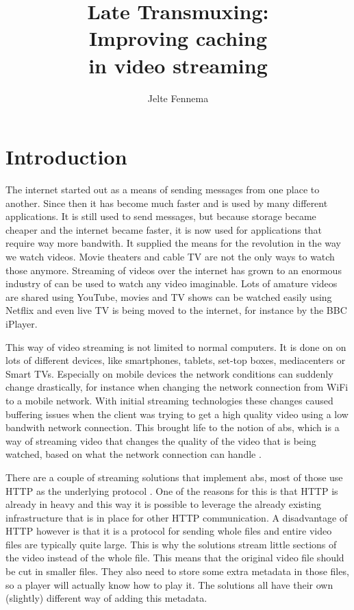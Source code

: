 \documentclass[twoside,openright]{uva-bachelor-thesis}
\title{Late Transmuxing:\\Improving caching \\in video streaming}
\author{Jelte Fennema}
\begin{document}
\maketitle

\begin{abstract}
\end{abstract}


\tableofcontents

\chapter{Introduction}
The internet started out as a means of sending messages from one place to
another. Since then it has become much faster and is used by many different
applications. It is still used to send messages, but because storage became
cheaper and the internet became faster, it is now used for applications that
require way more bandwith. It supplied the means for the revolution in the way
we watch videos. Movie theaters and cable TV are not the only ways to watch
those anymore. Streaming of videos over the internet has grown to an enormous
industry of can be used to watch any video imaginable. Lots of amature videos
are shared using YouTube, movies and TV shows can be watched easily using
Netflix and even live TV is being moved to the internet, for instance by the BBC
iPlayer.

This way of video streaming is not limited to normal computers. It is done on on
lots of different devices, like smartphones, tablets, set-top boxes,
mediacenters or Smart TVs. Especially on mobile devices the network conditions
can suddenly change drastically, for instance when changing the network
connection from WiFi to a mobile network. With initial streaming technologies
these changes caused buffering issues when the client was trying to get a high
quality video using a low bandwith network connection. This brought life to the
notion of \gls{abs}, which is a way of streaming video that changes the quality
of the video that is being watched, based on what the network connection can
handle \autocite{abs}.

There are a couple of streaming solutions that implement \gls{abs}, most of
those use HTTP as the underlying protocol \autocite{http}.  One of the reasons
for this is that HTTP is already in heavy and this way it is possible to
leverage the already existing infrastructure that is in place for other HTTP
communication. A disadvantage of HTTP however is that it is a protocol for
sending whole files and entire video files are typically quite large. This is
why the solutions stream little sections of the video instead of the whole file.
This means that the original video file should be cut in smaller files. They
also need to store some extra metadata in those files, so a player will actually
know how to play it. The solutions all have their own (slightly) different way
of adding this metadata.
\end{document}
